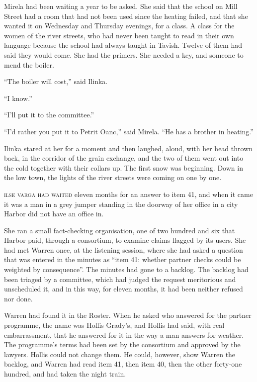 Mirela had been waiting a year to be asked. She said that the school on Mill Street had a room that had not been used since the heating failed, and that she wanted it on Wednesday and Thursday evenings, for a class. A class for the women of the river streets, who had never been taught to read in their own language because the school had always taught in Tavish. Twelve of them had said they would come. She had the primers. She needed a key, and someone to mend the boiler.

``The boiler will cost,'' said Ilinka.

``I know.''

``I'll put it to the committee.''

``I'd rather you put it to Petrit Oanc,'' said Mirela. ``He has a brother in heating.''

Ilinka stared at her for a moment and then laughed, aloud, with her head thrown back, in the corridor of the grain exchange, and the two of them went out into the cold together with their collars up. The first snow was beginning. Down in the low town, the lights of the river streets were coming on one by one.


\textsc{ilse varga had waited} eleven months for an answer to item 41, and when it came it was a man in a grey jumper standing in the doorway of her office in a city Harbor did not have an office in.

She ran a small fact-checking organisation, one of two hundred and six that Harbor paid, through a consortium, to examine claims flagged by its users. She had met Warren once, at the listening session, where she had asked a question that was entered in the minutes as ``item 41: whether partner checks could be weighted by consequence''. The minutes had gone to a backlog. The backlog had been triaged by a committee, which had judged the request meritorious and unscheduled it, and in this way, for eleven months, it had been neither refused nor done.

Warren had found it in the Roster. When he asked who answered for the partner programme, the name was Hollis Grady's, and Hollis had said, with real embarrassment, that he answered for it in the way a man answers for weather. The programme's terms had been set by the consortium and approved by the lawyers. Hollis could not change them. He could, however, show Warren the backlog, and Warren had read item 41, then item 40, then the other forty-one hundred, and had taken the night train.

